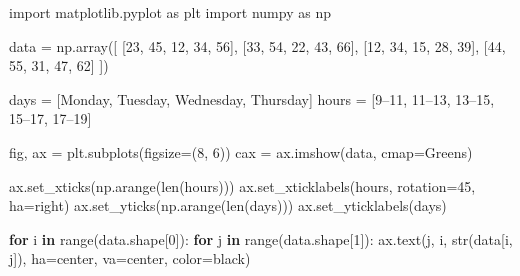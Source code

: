 \documentclass[
  english,
  letterpaper,
  DIV=11,
  numbers=noendperiod]{scrreprt}
\newenvironment{Shaded}{\begin{snugshade}}{\end{snugshade}}
\newcommand{\BuiltInTok}[1]{\textcolor[rgb]{0.00,0.23,0.31}{#1}}
\newcommand{\ControlFlowTok}[1]{\textcolor[rgb]{0.00,0.23,0.31}{\textbf{#1}}}
\newcommand{\DecValTok}[1]{\textcolor[rgb]{0.68,0.00,0.00}{#1}}
\newcommand{\ImportTok}[1]{\textcolor[rgb]{0.00,0.46,0.62}{#1}}
\newcommand{\KeywordTok}[1]{\textcolor[rgb]{0.00,0.23,0.31}{\textbf{#1}}}
\newcommand{\NormalTok}[1]{\textcolor[rgb]{0.00,0.23,0.31}{#1}}
\newcommand{\OperatorTok}[1]{\textcolor[rgb]{0.37,0.37,0.37}{#1}}
\newcommand{\StringTok}[1]{\textcolor[rgb]{0.13,0.47,0.30}{#1}}
\begin{document}
\begin{Shaded}
\begin{Highlighting}[]
\ImportTok{import}\NormalTok{ matplotlib.pyplot }\ImportTok{as}\NormalTok{ plt}
\ImportTok{import}\NormalTok{ numpy }\ImportTok{as}\NormalTok{ np}

\NormalTok{data }\OperatorTok{=}\NormalTok{ np.array([}
\NormalTok{    [}\DecValTok{23}\NormalTok{, }\DecValTok{45}\NormalTok{, }\DecValTok{12}\NormalTok{, }\DecValTok{34}\NormalTok{, }\DecValTok{56}\NormalTok{],}
\NormalTok{    [}\DecValTok{33}\NormalTok{, }\DecValTok{54}\NormalTok{, }\DecValTok{22}\NormalTok{, }\DecValTok{43}\NormalTok{, }\DecValTok{66}\NormalTok{],}
\NormalTok{    [}\DecValTok{12}\NormalTok{, }\DecValTok{34}\NormalTok{, }\DecValTok{15}\NormalTok{, }\DecValTok{28}\NormalTok{, }\DecValTok{39}\NormalTok{],}
\NormalTok{    [}\DecValTok{44}\NormalTok{, }\DecValTok{55}\NormalTok{, }\DecValTok{31}\NormalTok{, }\DecValTok{47}\NormalTok{, }\DecValTok{62}\NormalTok{]}
\NormalTok{])}

\NormalTok{days }\OperatorTok{=}\NormalTok{ [}\StringTok{\textquotesingle{}Monday\textquotesingle{}}\NormalTok{, }\StringTok{\textquotesingle{}Tuesday\textquotesingle{}}\NormalTok{, }\StringTok{\textquotesingle{}Wednesday\textquotesingle{}}\NormalTok{, }\StringTok{\textquotesingle{}Thursday\textquotesingle{}}\NormalTok{]}
\NormalTok{hours }\OperatorTok{=}\NormalTok{ [}\StringTok{\textquotesingle{}9–11\textquotesingle{}}\NormalTok{, }\StringTok{\textquotesingle{}11–13\textquotesingle{}}\NormalTok{, }\StringTok{\textquotesingle{}13–15\textquotesingle{}}\NormalTok{, }\StringTok{\textquotesingle{}15–17\textquotesingle{}}\NormalTok{, }\StringTok{\textquotesingle{}17–19\textquotesingle{}}\NormalTok{]}

\NormalTok{fig, ax }\OperatorTok{=}\NormalTok{ plt.subplots(figsize}\OperatorTok{=}\NormalTok{(}\DecValTok{8}\NormalTok{, }\DecValTok{6}\NormalTok{))}
\NormalTok{cax }\OperatorTok{=}\NormalTok{ ax.imshow(data, cmap}\OperatorTok{=}\StringTok{\textquotesingle{}Greens\textquotesingle{}}\NormalTok{)}

\NormalTok{ax.set\_xticks(np.arange(}\BuiltInTok{len}\NormalTok{(hours)))}
\NormalTok{ax.set\_xticklabels(hours, rotation}\OperatorTok{=}\DecValTok{45}\NormalTok{, ha}\OperatorTok{=}\StringTok{\textquotesingle{}right\textquotesingle{}}\NormalTok{)}
\NormalTok{ax.set\_yticks(np.arange(}\BuiltInTok{len}\NormalTok{(days)))}
\NormalTok{ax.set\_yticklabels(days)}

\ControlFlowTok{for}\NormalTok{ i }\KeywordTok{in} \BuiltInTok{range}\NormalTok{(data.shape[}\DecValTok{0}\NormalTok{]):}
    \ControlFlowTok{for}\NormalTok{ j }\KeywordTok{in} \BuiltInTok{range}\NormalTok{(data.shape[}\DecValTok{1}\NormalTok{]):}
\NormalTok{        ax.text(j, i, }\BuiltInTok{str}\NormalTok{(data[i, j]), ha}\OperatorTok{=}\StringTok{\textquotesingle{}center\textquotesingle{}}\NormalTok{, va}\OperatorTok{=}\StringTok{\textquotesingle{}center\textquotesingle{}}\NormalTok{, color}\OperatorTok{=}\StringTok{\textquotesingle{}black\textquotesingle{}}\NormalTok{)}


\end{Highlighting}
\end{Shaded}
\end{document}
